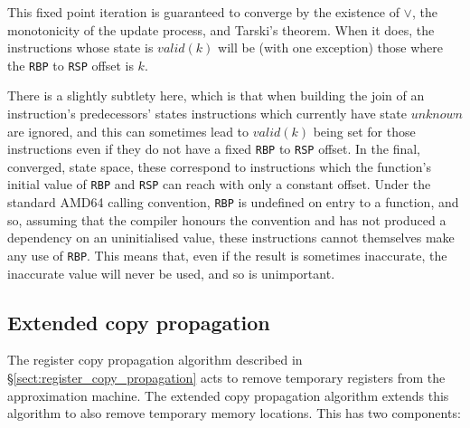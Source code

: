 \documentclass[12pt,a4paper]{book}
\begin{document}
This fixed point iteration is guaranteed to converge by the existence of $\vee$, the monotonicity of the update process, and Tarski's theorem.
When it does, the instructions whose state is $valid(k)$ will be (with one exception) those where the \verb|RBP| to \verb|RSP| offset is $k$.

There is a slightly subtlety here, which is that when building the join of an instruction's predecessors' states instructions which currently have state $unknown$ are ignored, and this can sometimes lead to $valid(k)$ being set for those instructions even if they do not have a fixed \verb|RBP| to \verb|RSP| offset.
In the final, converged, state space, these correspond to instructions which the function's initial value of \verb|RBP| and \verb|RSP| can reach with only a constant offset.
Under the standard AMD64 calling convention, \verb|RBP| is undefined on entry to a function, and so, assuming that the compiler honours the convention and has not produced a dependency on an uninitialised value, these instructions cannot themselves make any use of \verb|RBP|.
This means that, even if the result is sometimes inaccurate, the inaccurate value will never be used, and so is unimportant.




\subsection{Extended copy propagation}

The register copy propagation algorithm described in \S\ref{sect:register_copy_propagation} acts to remove temporary registers from the approximation machine.
The extended copy propagation algorithm extends this algorithm to also remove temporary memory locations.
This has two components:
\end{document}
